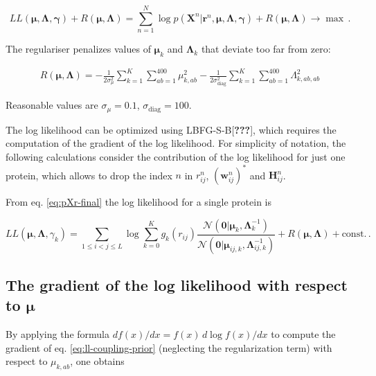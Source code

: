 \documentclass[12pt,a4paper,twoside]{book}
\newcommand{\Gauss}{\mathcal{N}}
\renewcommand{\H}{\mathbf{H}}
\newcommand{\Hij}{\H_{ij}}
\newcommand{\Lijk}{\mathbf{\Lambda}_{ij,k}}
\newcommand{\Lk}{\mathbf{\Lambda}_k}
\newcommand{\muijk}{\mathbf{\mu}_{ij,k}}
\newcommand{\muk}{\mathbf{\mu}_k}
\renewcommand{\r}{\mathbf{r}}
\newcommand{\rij}{r_{ij}}
\newcommand{\wij}{\mathbf{w}_{ij}}
\newcommand{\X}{\mathbf{X}}
\theoremstyle{definition}
\theoremstyle{definition}
\theoremstyle{remark}
\begin{document}
\begin{equation}
    L\!L(\mathbf{\mu}, \mathbf{\Lambda}, \mathbf{\gamma}) + R(\mathbf{\mu}, \mathbf{\Lambda}) = \sum_{n=1}^N  \log p(\X^n | \r^n, \mathbf{\mu}, \mathbf{\Lambda}, \mathbf{\gamma} ) + R(\mathbf{\mu}, \mathbf{\Lambda})  \rightarrow \max \, .
\end{equation}

The regulariser penalizes values of \(\muk\) and \(\Lk\) that deviate
too far from zero:

\begin{align}
    R(\mathbf{\mu}, \mathbf{\Lambda}) = -\frac{1}{2 \sigma_{\mu}^2} \sum_{k=1}^K \sum_{ab=1}^{400} \mu_{k,ab}^2 
                        -\frac{1}{2 \sigma_\text{diag}^2} \sum_{k=1}^K \sum_{ab=1}^{400} \Lambda_{k,ab,ab}^2
\label{eq:reg}
\end{align}

Reasonable values are \(\sigma_{\mu}=0.1\),
\(\sigma_\text{diag} = 100\).

The log likelihood can be optimized using LBFG-S-B{[}{\textbf{???}}{]},
which requires the computation of the gradient of the log likelihood.
For simplicity of notation, the following calculations consider the
contribution of the log likelihood for just one protein, which allows to
drop the index \(n\) in \(\rij^n\), \((\wij^n)^*\) and \(\Hij^n\).

From eq. \eqref{eq:pXr-final} the log likelihood for a single protein is

\begin{equation}
    L\!L(\mathbf{\mu}, \mathbf{\Lambda}, \gamma_k) =  \sum_{1 \le i < j \le L}  \log \sum_{k=0}^K g_{k}(\rij) \frac{\Gauss( \mathbf{0} | \muk, \Lk^{-1})}{\Gauss(\mathbf{0} | \muijk, \Lijk^{-1})}  + R(\mathbf{\mu}, \mathbf{\Lambda}) + \text{const.}\,.
\label{eq:ll-coupling-prior}
\end{equation}

\subsection{\texorpdfstring{The gradient of the log likelihood with
respect to
\(\mathbf{\mu}\)}{The gradient of the log likelihood with respect to \textbackslash{}mathbf\{\textbackslash{}mu\}}}\label{the-gradient-of-the-log-likelihood-with-respect-to-mathbfmu}

By applying the formula \(d f(x) / dx = f(x) \, d \log f(x) / dx\) to
compute the gradient of eq. \eqref{eq:ll-coupling-prior} (neglecting the
regularization term) with respect to \(\mu_{k,ab}\), one obtains
\end{document}
